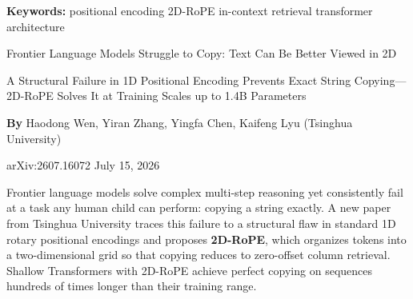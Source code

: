 \documentclass[10pt,twocolumn]{article}
\begin{document}
\setlength{\parindent}{0pt}
\setlength{\parskip}{4pt}

{\small\color{keywordgray}\textbf{Keywords:}
  positional encoding \textbullet{}
  2D-RoPE \textbullet{}
  in-context retrieval \textbullet{}
  transformer architecture}\par\vspace{4pt}

{\LARGE\bfseries\raggedright
  Frontier Language Models Struggle to Copy:
  Text Can Be Better Viewed in 2D}\par\vspace{4pt}

{\large\itshape\raggedright
  A Structural Failure in 1D Positional Encoding Prevents Exact
  String Copying---2D-RoPE Solves It at Training Scales up to 1.4B
  Parameters}\par\vspace{6pt}

{\small\textbf{By} Haodong Wen, Yiran Zhang, Yingfa Chen, Kaifeng Lyu
  (Tsinghua University)}\par\vspace{2pt}

{\small\color{keywordgray}arXiv:2607.16072 \textbullet{} July 15, 2026}
\par\vspace{2pt}\noindent{\color{rulered}\rule{\columnwidth}{0.6pt}}\vspace{6pt}

Frontier language models solve complex multi-step reasoning yet
consistently fail at a task any human child can perform: copying a
string exactly. A new paper from Tsinghua University traces this failure
to a structural flaw in standard 1D rotary positional encodings and
proposes \textbf{2D-RoPE}, which organizes tokens into a two-dimensional
grid so that copying reduces to zero-offset column retrieval.
Shallow Transformers with 2D-RoPE achieve perfect copying on sequences
hundreds of times longer than their training range.
\end{document}
